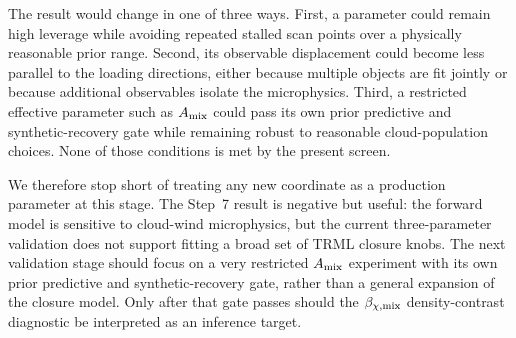 The result would change in one of three ways.  First, a parameter could remain
high leverage while avoiding repeated stalled scan points over a physically
reasonable prior range.  Second, its observable displacement could become less
parallel to the loading directions, either because multiple objects are fit
jointly or because additional observables isolate the microphysics.  Third, a
restricted effective parameter such as $A_{\rm mix}$ could pass its own prior
predictive and synthetic-recovery gate while remaining robust to reasonable
cloud-population choices.  None of those conditions is met by the present
screen.

We therefore stop short of treating any new coordinate as a production
parameter at this stage.  The
Step~7 result is negative but useful: the forward model is sensitive to
cloud-wind microphysics, but the current three-parameter validation does not
support fitting a broad set of TRML closure knobs.  The next validation stage
should focus on a very restricted $A_{\rm mix}$ experiment with its own prior
predictive and synthetic-recovery gate, rather than a general expansion of the
closure model.  Only after that gate passes should the
$\beta_{\chi,\rm mix}$ density-contrast diagnostic be interpreted as an
inference target.

\clearpage
